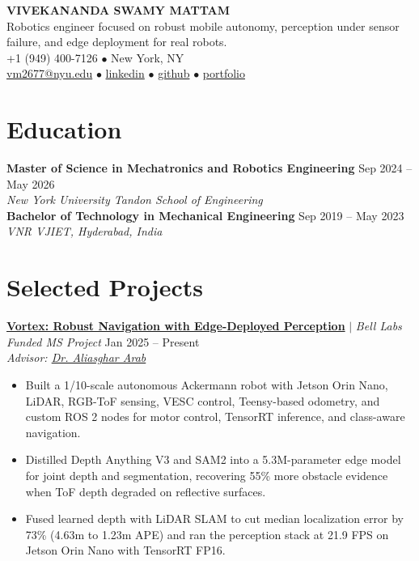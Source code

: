 \documentclass[10pt,letterpaper]{article}
\begin{document}
\begin{center}
    {\Large \textbf{VIVEKANANDA SWAMY MATTAM}} \\
    \vspace{4pt}
    \small
    Robotics engineer focused on robust mobile autonomy, perception under sensor failure, and edge deployment for real robots. \\
    \vspace{3pt}
    +1 (949) 400-7126 \quad $\bullet$ \quad New York, NY \\
    \href{mailto:vm2677@nyu.edu}{vm2677@nyu.edu} \quad $\bullet$ \quad
    \href{https://linkedin.com/in/vivek-mattam-a8590b23a}{linkedin} \quad $\bullet$ \quad
    \href{https://github.com/vivekmattam02}{github} \quad $\bullet$ \quad
    \href{https://vivekmattam02.github.io}{portfolio}
\end{center}
\vspace{-4pt}

\section{Education}

\textbf{Master of Science in Mechatronics and Robotics Engineering} \hfill Sep 2024 -- May 2026 \\
\textit{New York University Tandon School of Engineering} \\
\textbf{Bachelor of Technology in Mechanical Engineering} \hfill Sep 2019 -- May 2023 \\
\textit{VNR VJIET, Hyderabad, India}
\vspace{-2pt}

\section{Selected Projects}

\href{https://github.com/vivekmattam02/ros2-ackermann-racing-navigation}{\textbf{Vortex: Robust Navigation with Edge-Deployed Perception}} $|$ \textit{Bell Labs Funded MS Project} \hfill Jan 2025 -- Present \\
\textit{Advisor: \href{https://wp.nyu.edu/aarab/}{Dr. Aliasghar Arab}}
\begin{itemize}
    \item Built a 1/10-scale autonomous Ackermann robot with Jetson Orin Nano, LiDAR, RGB-ToF sensing, VESC control, Teensy-based odometry, and custom ROS 2 nodes for motor control, TensorRT inference, and class-aware navigation.
    \item Distilled Depth Anything V3 and SAM2 into a 5.3M-parameter edge model for joint depth and segmentation, recovering 55\% more obstacle evidence when ToF depth degraded on reflective surfaces.
    \item Fused learned depth with LiDAR SLAM to cut median localization error by 73\% (4.63m to 1.23m APE) and ran the perception stack at 21.9 FPS on Jetson Orin Nano with TensorRT FP16.
\end{itemize}
\vspace{1pt}
\end{document}
